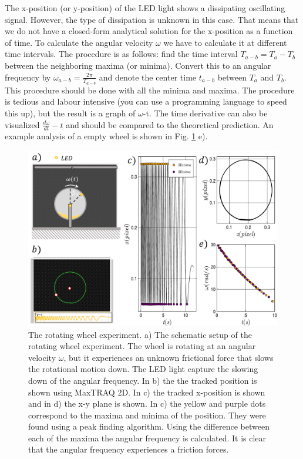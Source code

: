 \documentclass{article}
\begin{document}
The x-position (or y-position) of the LED light shows a dissipating oscillating signal. However, the type of dissipation is unknown in this case. That means that we do not have a closed-form analytical solution for the x-position as a function of time. To calculate the angular velocity $\omega$ we have to calculate it at different time intervals. The procedure is as follows: find the time interval $T_{a-b}=T_a-T_b$ between the neighboring maxima (or minima). Convert this to an angular frequency by $\omega_{a-b} = \frac{2\pi}{T_{a-b}}$ and denote the center time $t_{a-b}$ between $T_a$ and $T_b$. This procedure should be done with all the minima and maxima. The procedure is tedious and labour intensive (you can use a programming language to speed this up), but the result is a graph of $\omega$-t. The time derivative can also be visualized $\frac{d\omega}{dt}-t$ and should be compared to the theoretical prediction. An example analysis of a empty wheel is shown in Fig. \ref{Fig. Rotating Wheel} e).

\begin{figure}
    \centering
    \includegraphics[width=12cm]{figures/Rotating Wheel.pdf}
    \caption{The rotating wheel experiment. a) The schematic setup of the rotating wheel experiment. The wheel is rotating at an angular velocity $\omega$, but it experiences an unknown frictional force that slows the rotational motion down. The LED light capture the slowing down of the angular frequency. In b) the the tracked position is shown using MaxTRAQ 2D. In c) the tracked x-position is shown and in d) the x-y plane is shown. In c) the yellow and purple dots correspond to the maxima and minima of the position. They were found using a peak finding algorithm. Using the difference between each of the maxima the angular frequency is calculated. It is clear that the angular frequency experiences a friction forces.}
    \label{Fig. Rotating Wheel}
\end{figure}
\end{document}
